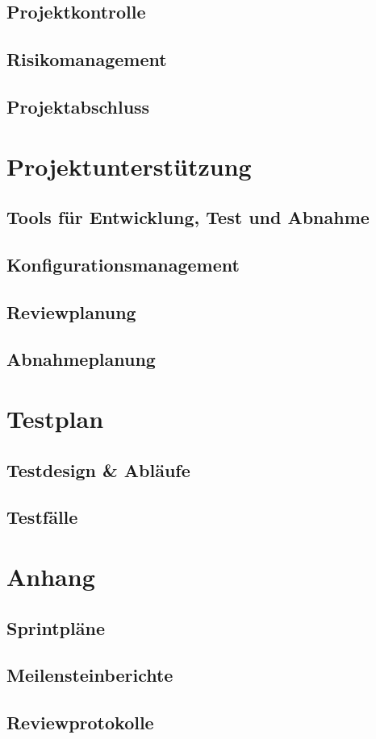 \documentclass[11pt,a4paper]{scrreprt}
\begin{document}
\section{Projektkontrolle}

\section{Risikomanagement}

\section{Projektabschluss}

\chapter{Projektunterstützung}

\section{Tools für Entwicklung, Test und Abnahme}

\section{Konfigurationsmanagement}

\section{Reviewplanung}

\section{Abnahmeplanung}

\chapter{Testplan}

\section{Testdesign \& Abläufe}

\section{Testfälle}

\appendix

\chapter{Anhang}

\section{Sprintpläne}

\section{Meilensteinberichte}

\section{Reviewprotokolle}
\end{document}
